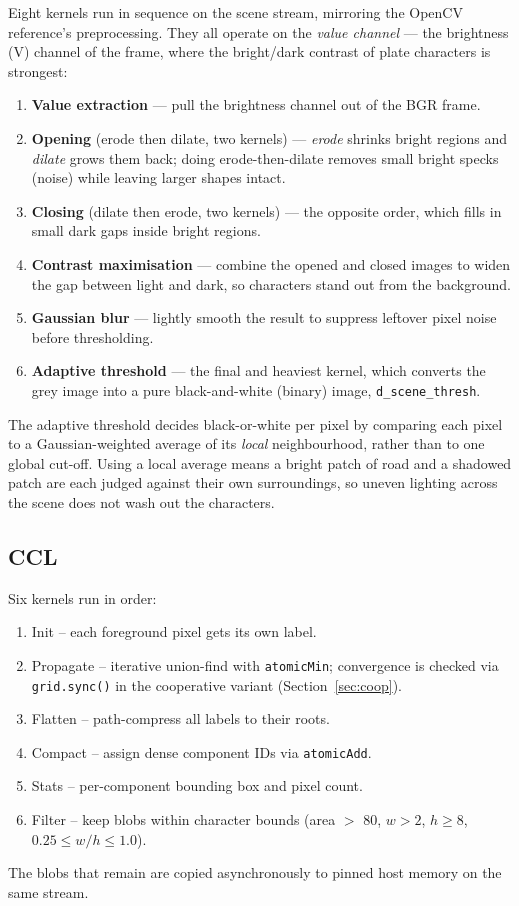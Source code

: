 Eight kernels run in sequence on the scene stream, mirroring the OpenCV reference's preprocessing.
They all operate on the \emph{value channel} --- the brightness (V) channel of the frame, where the bright/dark contrast of plate characters is strongest:

\begin{enumerate}
  \item \textbf{Value extraction} --- pull the brightness channel out of the BGR frame.
  \item \textbf{Opening} (erode then dilate, two kernels) --- \emph{erode} shrinks bright regions and \emph{dilate} grows them back; doing erode-then-dilate removes small bright specks (noise) while leaving larger shapes intact.
  \item \textbf{Closing} (dilate then erode, two kernels) --- the opposite order, which fills in small dark gaps inside bright regions.
  \item \textbf{Contrast maximisation} --- combine the opened and closed images to widen the gap between light and dark, so characters stand out from the background.
  \item \textbf{Gaussian blur} --- lightly smooth the result to suppress leftover pixel noise before thresholding.
  \item \textbf{Adaptive threshold} --- the final and heaviest kernel, which converts the grey image into a pure black-and-white (binary) image, \texttt{d\_scene\_thresh}.
\end{enumerate}

The adaptive threshold decides black-or-white per pixel by comparing each pixel to a Gaussian-weighted average of its \emph{local} neighbourhood, rather than to one global cut-off.
Using a local average means a bright patch of road and a shadowed patch are each judged against their own surroundings, so uneven lighting across the scene does not wash out the characters.

\subsection{CCL}
\label{sec:ccl}

Six kernels run in order:
\begin{enumerate}
  \item Init -- each foreground pixel gets its own label.
  \item Propagate -- iterative union-find with \texttt{atomicMin}; convergence is checked via \texttt{grid.sync()} in the cooperative variant (Section~\ref{sec:coop}).
  \item Flatten -- path-compress all labels to their roots.
  \item Compact -- assign dense component IDs via \texttt{atomicAdd}.
  \item Stats -- per-component bounding box and pixel count.
  \item Filter -- keep blobs within character bounds (area $>$ 80, $w > 2$, $h \ge 8$, $0.25 \le w/h \le 1.0$).
\end{enumerate}
The blobs that remain are copied asynchronously to pinned host memory on the same stream.

